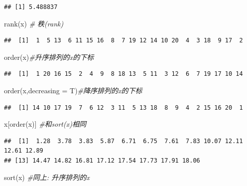 \documentclass[
]{book}
\newenvironment{Shaded}{\begin{snugshade}}{\end{snugshade}}
\newcommand{\AttributeTok}[1]{\textcolor[rgb]{0.77,0.63,0.00}{#1}}
\newcommand{\CommentTok}[1]{\textcolor[rgb]{0.56,0.35,0.01}{\textit{#1}}}
\newcommand{\FunctionTok}[1]{\textcolor[rgb]{0.00,0.00,0.00}{#1}}
\newcommand{\NormalTok}[1]{#1}
\begin{document}
\begin{verbatim}
## [1] 5.488837
\end{verbatim}

\begin{Shaded}
\begin{Highlighting}[]
\FunctionTok{rank}\NormalTok{(x)    }\CommentTok{\# 秩(rank)}
\end{Highlighting}
\end{Shaded}

\begin{verbatim}
##  [1]  1  5 13  6 11 15 16  8  7 19 12 14 10 20  4  3 18  9 17  2
\end{verbatim}

\begin{Shaded}
\begin{Highlighting}[]
\FunctionTok{order}\NormalTok{(x)}\CommentTok{\#升序排列的x的下标}
\end{Highlighting}
\end{Shaded}

\begin{verbatim}
##  [1]  1 20 16 15  2  4  9  8 18 13  5 11  3 12  6  7 19 17 10 14
\end{verbatim}

\begin{Shaded}
\begin{Highlighting}[]
\FunctionTok{order}\NormalTok{(x,}\AttributeTok{decreasing =}\NormalTok{ T)}\CommentTok{\#降序排列的x的下标}
\end{Highlighting}
\end{Shaded}

\begin{verbatim}
##  [1] 14 10 17 19  7  6 12  3 11  5 13 18  8  9  4  2 15 16 20  1
\end{verbatim}

\begin{Shaded}
\begin{Highlighting}[]
\NormalTok{x[}\FunctionTok{order}\NormalTok{(x)] }\CommentTok{\#和sort(x)相同}
\end{Highlighting}
\end{Shaded}

\begin{verbatim}
##  [1]  1.28  3.78  3.83  5.87  6.71  6.75  7.61  7.83 10.07 12.11 12.61 12.89
## [13] 14.47 14.82 16.81 17.12 17.54 17.73 17.91 18.06
\end{verbatim}

\begin{Shaded}
\begin{Highlighting}[]
\FunctionTok{sort}\NormalTok{(x)     }\CommentTok{\#同上: 升序排列的x}
\end{Highlighting}
\end{Shaded}
\end{document}
